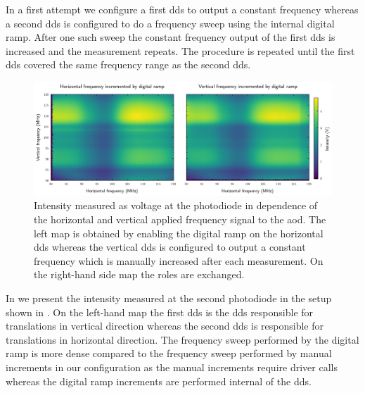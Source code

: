 In a first attempt we configure a first \gls{dds} to output a constant
frequency whereas a second \gls{dds} is configured to do a frequency sweep
using the internal digital ramp. After one such sweep the constant frequency
output of the first \gls{dds} is increased and the measurement repeats. The
procedure is repeated until the first \gls{dds} covered the same frequency
range as the second \gls{dds}.
\begin{figure}[htb]
  \centering
  \includegraphics[width=\textwidth]
  {../figure/intensity/distribution/paired-frequency.png}
  \caption{Intensity measured as voltage at the photodiode in dependence of
    the horizontal and vertical applied frequency signal to the \gls{aod}. The
    left map is obtained by enabling the digital ramp on the horizontal
    \gls{dds} whereas the vertical \gls{dds} is configured to output a
    constant frequency which is manually increased after each measurement.
    On the right-hand side map the roles are exchanged.
  }\label{fig:intensity_distribution_frequency}
\end{figure}
In  we present the intensity
measured at the second photodiode in the setup shown in
. On the left-hand map the first
\gls{dds} is the \gls{dds} responsible for translations in vertical direction
whereas the second \gls{dds} is responsible for translations in horizontal
direction. The frequency sweep performed by the digital ramp is more dense
compared to the frequency sweep performed by manual increments in our
configuration as the manual increments require driver calls whereas the
digital ramp increments are performed internal of the \gls{dds}.
